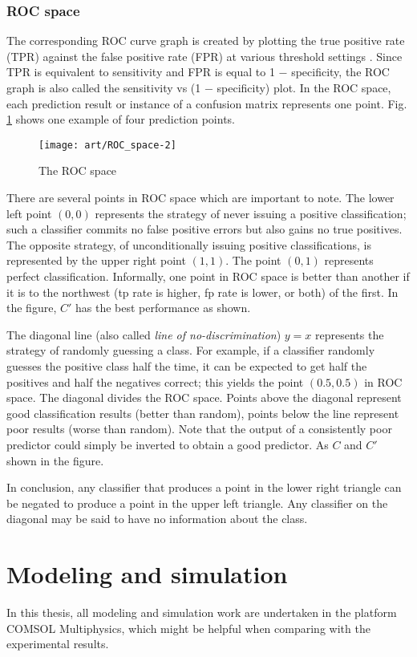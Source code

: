 \subsubsection{ROC space}
The corresponding ROC curve graph is created by plotting the true positive rate (TPR) against the false positive rate (FPR) at various threshold settings \citep{Fawcett2006}.  Since TPR is equivalent to sensitivity and FPR is equal to 1 − specificity, the ROC graph is also called the sensitivity vs (1 − specificity) plot. In the ROC space, each prediction result or instance of a confusion matrix represents one point. Fig. \ref{ROC_space} shows one example of four prediction points.
\begin{figure}[ht]
	\centering
	\texttt{[image: art/ROC\_space-2]}
	\caption{The ROC space}
	\label{ROC_space}
\end{figure}
There are several points in ROC space which are important to note. The lower left point $ (0,0) $ represents the strategy of never issuing a positive classification; such a classifier commits no false positive errors but also gains no true positives. The opposite strategy, of unconditionally issuing positive classifications, is represented by the upper right point $ (1,1) $. The point $ (0,1) $ represents perfect classification.  Informally, one point in ROC space is better than another if it is to the northwest (tp rate is higher, fp rate is lower, or both) of the first. In the figure, $C'$ has the best performance as shown.

The diagonal line (also called \textit{line of no-discrimination}) $y = x$ represents the strategy of randomly guessing a class. For example, if a classifier randomly guesses the positive class half the time, it can be expected to get half the positives and half the negatives correct; this yields the point $ (0.5, 0.5) $ in ROC space. The diagonal divides the ROC space. Points above the diagonal represent good classification results (better than random), points below the line represent poor results (worse than random). Note that the output of a consistently poor predictor could simply be inverted to obtain a good predictor. As $C$ and $C'$ shown in the figure.

In conclusion,  any classifier that produces a point in the lower right triangle can be negated to produce a point in the upper left triangle. Any classifier on the diagonal may be said to have no information about the class.

\section{Modeling and simulation}
In this thesis, all modeling and simulation work are undertaken in the platform COMSOL Multiphysics{\textregistered}, which might be helpful when comparing with the experimental results.

